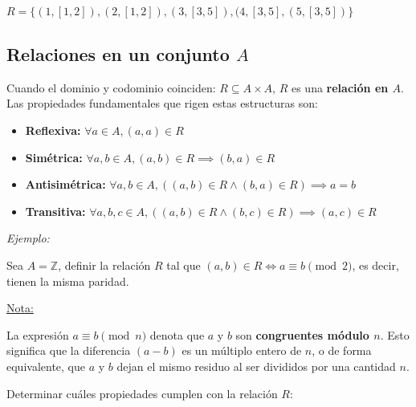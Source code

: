 \documentclass{article}
\begin{document}
$R = \{(1, \left[1, 2\right]), (2, \left[1, 2\right]), (3, \left[3, 5\right]), (4, \left[3, 5\right], (5, \left[3, 5\right])\}$

\subsection{Relaciones en un conjunto $A$}

Cuando el dominio y codominio coinciden: $R \subseteq A \times A$, $R$ es una \textbf{relación en $A$}. Las propiedades fundamentales que rigen estas estructuras son:

\begin{itemize}
    \item \textbf{Reflexiva:} $\forall a \in A, (a, a) \in R$
    \item \textbf{Simétrica:} $\forall a,b \in A, (a, b) \in R \implies (b, a) \in R$
    \item \textbf{Antisimétrica:} $\forall a,b \in A, ((a, b) \in R \land (b, a) \in R) \implies a = b$
    \item \textbf{Transitiva:} $\forall a,b,c \in A, ((a, b) \in R \land (b, c) \in R) \implies (a, c) \in R$
\end{itemize}

\textit{Ejemplo:}

Sea $A = \mathbb{Z}$, definir la relación $R$ tal que $(a, b) \in R \iff a \equiv b \pmod 2$, es decir, tienen la misma paridad.

\underline{Nota:}

La expresión $a \equiv b \pmod n$ denota que $a$ y $b$ son \textbf{congruentes módulo $n$}. Esto significa que la diferencia $(a - b)$ es un múltiplo entero de $n$, o de forma equivalente, que $a$ y $b$ dejan el mismo residuo al ser divididos por una cantidad $n$.

\newpage
Determinar cuáles propiedades cumplen con la relación $R$:
\end{document}
